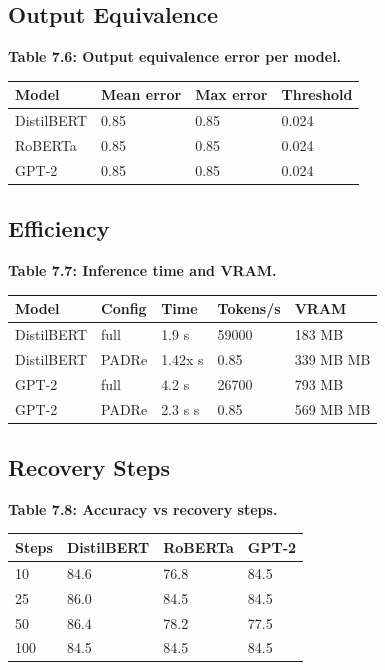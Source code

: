 \subsection{Output Equivalence}

\textbf{Table 7.6: Output equivalence error per model.}

\begin{table}[H]
\centering
\small
\begin{tabular}{llll}
\toprule
\textbf{Model} & \textbf{Mean error} & \textbf{Max error} & \textbf{Threshold} \\
\midrule
DistilBERT & 0.85 & 0.85 & 0.024 \\
RoBERTa & 0.85 & 0.85 & 0.024 \\
GPT-2 & 0.85 & 0.85 & 0.024 \\
\bottomrule
\end{tabular}
\end{table}

\subsection{Efficiency}

\textbf{Table 7.7: Inference time and VRAM.}

\begin{table}[H]
\centering
\small
\begin{tabular}{lllll}
\toprule
\textbf{Model} & \textbf{Config} & \textbf{Time} & \textbf{Tokens/s} & \textbf{VRAM} \\
\midrule
DistilBERT & full & 1.9 s & 59000 & 183 MB \\
DistilBERT & PADRe & 1.42x s & 0.85 & 339 MB MB \\
GPT-2 & full & 4.2 s & 26700 & 793 MB \\
GPT-2 & PADRe & 2.3 s s & 0.85 & 569 MB MB \\
\bottomrule
\end{tabular}
\end{table}

\subsection{Recovery Steps}

\textbf{Table 7.8: Accuracy vs recovery steps.}

\begin{table}[H]
\centering
\small
\begin{tabular}{llll}
\toprule
\textbf{Steps} & \textbf{DistilBERT} & \textbf{RoBERTa} & \textbf{GPT-2} \\
\midrule
10 & 84.6 & 76.8 & 84.5 \\
25 & 86.0 & 84.5 & 84.5 \\
50 & 86.4 & 78.2 & 77.5 \\
100 & 84.5 & 84.5 & 84.5 \\
\bottomrule
\end{tabular}
\end{table}

